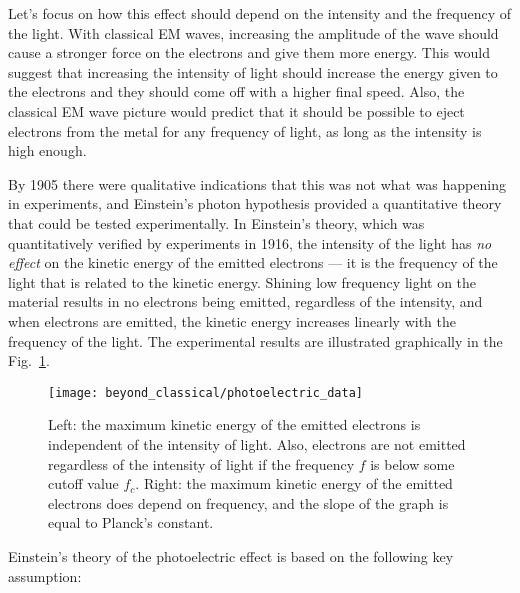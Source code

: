 Let's focus on how this effect should depend on the intensity and the
frequency of the light.  With classical EM waves, increasing the
amplitude of the wave should cause a stronger force on the electrons
and give them more energy.  This would suggest that increasing the
intensity of light should increase the energy given to the electrons
and they should come off with a higher final speed.  Also, the
classical EM wave picture would predict that it should be possible to
eject electrons from the metal for any frequency of light, as long as
the intensity is high enough.

By 1905 there were qualitative indications that this was not what
was happening in experiments, and Einstein's photon hypothesis
provided a quantitative theory that could be tested experimentally.
In Einstein's theory, which was quantitatively verified by experiments
in 1916, the intensity of the light has {\it no effect} on the kinetic
energy of the emitted electrons --- it is the frequency of the light
that is related to the kinetic energy.  Shining low frequency light on
the material results in no electrons being emitted, regardless of the
intensity, and when electrons are emitted, the kinetic energy increases
linearly with the frequency of the light. The experimental results are
illustrated graphically in the Fig.~\ref{fig:photoelectric_data}.

\begin{figure}
\begin{center}
\texttt{[image: beyond\_classical/photoelectric\_data]}
\caption{Left: the maximum kinetic energy of the emitted electrons is
  independent of the intensity of light.  Also, electrons are not
  emitted regardless of the intensity of light if the frequency $f$ is
  below some cutoff value $f_c$.  Right: the maximum kinetic energy of
  the emitted electrons does depend on frequency, and the slope of the
  graph is equal to Planck's constant.}
\label{fig:photoelectric_data}
\end{center}
\end{figure}

Einstein's theory of the photoelectric effect is based on the following
key assumption: 


